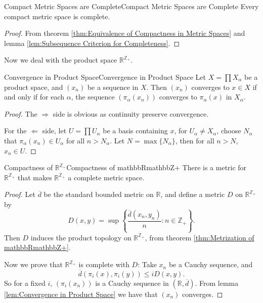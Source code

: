 \documentclass[../main.tex]{subfiles}
\begin{document}
\begin{theorem}{Compact Metric Spaces are Complete}{Compact Metric Spaces are Complete}
	Every compact metric space is complete.
\end{theorem}
\begin{proof}
	From theorem \ref{thm:Equivalence of Compactness in Metric Spaces} and lemma \ref{lem:Subsequence Criterion for Completeness}.
\end{proof}

Now we deal with the product space $\mathbb{R}^{\mathbb{Z}_+}$.

\begin{lemma}{Convergence in Product Space}{Convergence in Product Space}
	Let $X = \prod X_{\alpha}$ be a product space, and $(x_n)$ be a sequence in $X$. Then $(x_n)$ converges to $x \in X$ if and only if for each $\alpha$, the sequence $(\pi_{\alpha}(x_n))$ converges to $\pi_{\alpha}(x)$ in $X_{\alpha}$.
\end{lemma}
\begin{proof}
The $\Rightarrow$ side is obvious as continuity preserve convergence.

For the $\Leftarrow$ side, let $U = \prod U_{\alpha}$ be a basis containing $x$, for $U_{\alpha} \neq X_{\alpha}$, choose $N_{\alpha}$ that $\pi_{\alpha}(x_n) \in U_{\alpha}$ for all $n > N_{\alpha}$. Let $N = \max \{N_{\alpha}\}$, then for all $n > N$, $x_n \in U$.
\end{proof}

\begin{theorem}{Compactness of $\mathbb{R}^{\mathbb{Z}_+}$}{Compactness of mathbbRmathbbZ+}
	There is a metric for $\mathbb{R}^{\mathbb{Z}_+}$ that makes $\mathbb{R}^{\mathbb{Z}_+}$ a complete metric space.
\end{theorem}
\begin{proof}
	Let $\overline{d}$ be the standard bounded metric on $\mathbb{R}$, and define a metric $D$ on $\mathbb{R}^{\mathbb{Z}_+}$ by
	\begin{equation}
		D(x,y) = \sup \left\{\frac{\overline{d}(x_n,y_n)}{n} : n \in \mathbb{Z}_+ \right\}.
	\end{equation}
	Then $D$ induces the product topology on $\mathbb{R}^{\mathbb{Z}_+}$, from theorem \ref{thm:Metrization of mathbbRmathbbZ+}.

	Now we prove that $\mathbb{R}^{\mathbb{Z}_+}$ is complete with $D$: Take $x_n$ be a Cauchy sequence, and
	\begin{equation*}
		\overline{d}(\pi_i(x), \pi_i(y)) \leq i D(x,y).
	\end{equation*}
	So for a fixed $i$, $(\pi_i(x_n))$ is a Cauchy sequence in $(\mathbb{R},\overline{d})$. From lemma \ref{lem:Convergence in Product Space} we have that $(x_n)$ converges.
\end{proof}
\end{document}

